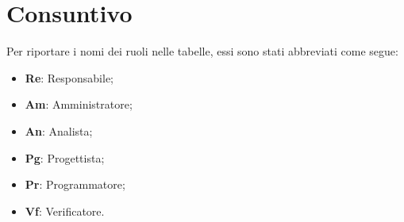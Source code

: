 \nonstopmode
\pagebreak

\section{Consuntivo}

Per riportare i nomi dei ruoli nelle tabelle, essi sono stati abbreviati come segue:

\begin{itemize}
\item \textbf{Re}: Responsabile;
\item \textbf{Am}: Amministratore;
\item \textbf{An}: Analista;
\item \textbf{Pg}: Progettista;
\item \textbf{Pr}: Programmatore;
\item \textbf{Vf}: Verificatore.
\end{itemize}


